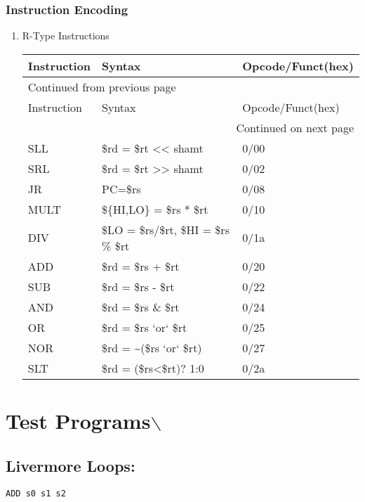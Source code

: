 \documentclass[11pt]{article}
\begin{document}
\subsubsection{Instruction Encoding}
\label{sec:org33842d6}
\begin{enumerate}
\item R-Type Instructions
\label{sec:org4a8a8a8}
\begin{longtable}{l|l|l}
Instruction & Syntax & Opcode/Funct(hex)\\
\hline
\endfirsthead
\multicolumn{3}{l}{Continued from previous page} \\
\hline

Instruction & Syntax & Opcode/Funct(hex) \\

\hline
\endhead
\hline\multicolumn{3}{r}{Continued on next page} \\
\endfoot
\endlastfoot
\hline
SLL & \$rd = \$rt << shamt & 0/00\\
SRL & \$rd = \$rt >> shamt & 0/02\\
JR & PC=\$rs & 0/08\\
MULT & \$\{HI,LO\} = \$rs * \$rt & 0/10\\
DIV & \$LO = \$rs/\$rt, \$HI = \$rs \% \$rt & 0/1a\\
ADD & \$rd = \$rs + \$rt & 0/20\\
SUB & \$rd = \$rs - \$rt & 0/22\\
AND & \$rd = \$rs \& \$rt & 0/24\\
OR & \$rd = \$rs `or` \$rt & 0/25\\
NOR & \$rd = \textasciitilde{}(\$rs `or` \$rt) & 0/27\\
SLT & \$rd = (\$rs<\$rt)? 1:0 & 0/2a\\
\end{longtable}
\end{enumerate}


\section{Test Programs$\backslash$}
\label{sec:org502ed21}
\subsection{Livermore Loops:}
\label{sec:orge85aeee}
\begin{verbatim}
ADD s0 s1 s2
\end{verbatim}
\end{document}
